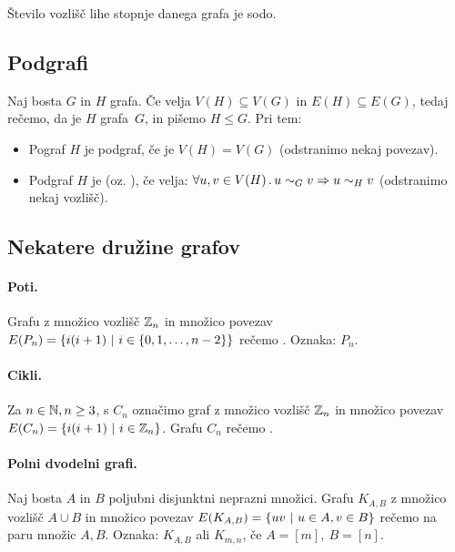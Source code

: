 \begin{posledica}
    Število vozlišč lihe stopnje danega grafa je sodo.
\end{posledica}

\subsection{Podgrafi}
\begin{definicija}
    Naj bosta $G$ in $H$ grafa. Če velja $V(H) \subseteq V(G)$ in $E(H) \subseteq E(G)$, tedaj rečemo, da je $H$  grafa~$G$, in pišemo $H \leq G$. Pri tem:
    \begin{itemize}
        \item Pograf $H$ je  podgraf, če je $V(H) = V(G)$ (odstranimo nekaj povezav).
        \item Podgraf $H$ je  (oz. ), če velja:  $\forall u, v \in V(H) \,.\, u \sim_G v \Rightarrow u \sim_H v$ (odstranimo nekaj vozlišč).
    \end{itemize}
\end{definicija}

\subsection{Nekatere družine grafov}
\paragraph{Poti.} Grafu z množico vozlišč $\mathbb{Z}_n$ in množico povezav $E(P_n) = \left\{i(i+1) \ | \ i \in \left\{0,1, \ldots, n-2\right\}\right\}$ rečemo . Oznaka: $P_n$.

\paragraph{Cikli.} Za $n \in \mathbb{N}, n \geq 3$, s $C_n$ označimo graf z množico vozlišč $\mathbb{Z}_n$ in množico povezav $E(C_n) = \left\{i(i+1) \ | \ i \in \mathbb{Z}_n\right\}$. Grafu $C_n$ rečemo .

\paragraph{Polni dvodelni grafi.} Naj bosta $A$ in $B$ poljubni disjunktni neprazni množici. Grafu $K_{A, B}$ z množico vozlišč $A \cup B$ in množico povezav $E(K_{A,B}) = \left\{uv \ | \ u \in A, v \in B\right\}$ rečemo  na paru množic $A, B$. Oznaka: $K_{A, B}$ ali $K_{m, n}$, če $A = [m], \ B = [n]$.

